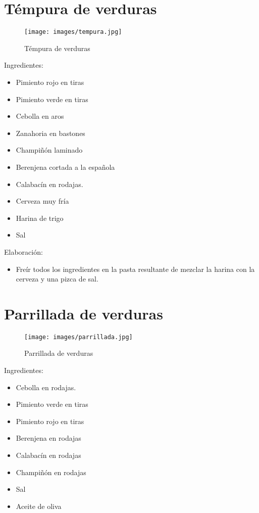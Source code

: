 \section{Témpura de verduras}
\label{sec:tempura}

\begin{figure}[h]
  \begin{center}
    \texttt{[image: images/tempura.jpg]}
    \caption{Témpura de verduras}
    \label{fig:tempura}
  \end{center}
\end{figure}

Ingredientes:
\begin{itemize}
\item Pimiento rojo en tiras
\item Pimiento verde en tiras
\item Cebolla en aros
\item Zanahoria en bastones
\item Champiñón laminado
\item Berenjena cortada a la española
\item Calabacín en rodajas.
\item Cerveza muy fría
\item Harina de trigo
\item Sal
\end{itemize}

Elaboración:
\begin{itemize}
\item Freír todos los ingredientes en la pasta resultante de mezclar la harina con la cerveza y una pizca de sal.
\end{itemize}

\section{Parrillada de verduras}
\label{sec:parrillada}

\begin{figure}[h]
  \begin{center}
    \texttt{[image: images/parrillada.jpg]}
    \caption{Parrillada de verduras}
    \label{fig:parrillada}
  \end{center}
\end{figure}

Ingredientes:
\begin{itemize}
\item Cebolla en rodajas.
\item Pimiento verde en tiras
\item Pimiento rojo en tiras
\item Berenjena en rodajas
\item Calabacín en rodajas
\item Champiñón en rodajas
\item Sal
\item Aceite de oliva
\end{itemize}

